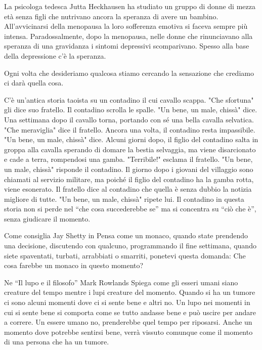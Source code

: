 \documentclass[12pt]{book} %
\begin{document}
La psicologa tedesca Jutta Heckhausen ha studiato un gruppo di donne di mezza età senza figli che nutrivano ancora la
speranza di avere un bambino. All'avvicinarsi della menopausa la loro sofferenza emotiva si faceva
sempre più intensa. Paradossalmente, dopo la menopausa, nelle donne che rinunciavano alla speranza di una gravidanza i
sintomi depressivi scomparivano. Spesso alla base della depressione c'è la speranza. 

\begin{mdframed}[linewidth=1pt]
Ogni volta che desideriamo qualcosa stiamo cercando la sensazione che crediamo ci darà quella cosa. 

C'è un'antica storia taoista su un contadino il cui cavallo scappa.
"Che sfortuna" gli dice suo fratello. Il contadino scrolla le spalle.
"Un bene, un male, chissà" dice. Una settimana dopo il cavallo torna,
portando con sé una bella cavalla selvatica. "Che meraviglia" dice il
fratello. Ancora una volta, il contadino resta impassibile. "Un bene, un male,
chissà" dice. Alcuni giorni dopo, il figlio del contadino salta in groppa alla cavalla sperando di
domare la bestia selvaggia, ma viene disarcionato e cade a terra, rompendosi una gamba.
"Terribile!" esclama il fratello. "Un bene, un male,
chissà" risponde il contadino. Il giorno dopo i giovani del villaggio sono chiamati al servizio
militare, ma poiché il figlio del contadino ha la gamba rotta, viene esonerato. Il fratello dice al contadino che
quella è senza dubbio la notizia migliore di tutte. "Un bene, un male,
chissà" ripete lui. Il contadino in questa storia non si perde nel “che cosa succederebbe se” ma
si concentra su “ciò che è”, senza giudicare il momento.

Come consiglia Jay Shetty in Pensa come un monaco, quando state prendendo una
decisione, discutendo con qualcuno, programmando il fine settimana, quando siete spaventati, turbati, arrabbiati o
smarriti, ponetevi questa domanda: Che cosa farebbe un monaco in questo momento? 

Ne “Il lupo e il filosofo” Mark
Rowlands Spiega come gli esseri umani siano creature del tempo mentre i lupi creature del momento. Quando si ha un
tumore ci sono alcuni momenti dove ci si sente bene e altri no. Un lupo nei momenti in cui si sente bene si comporta
come se tutto andasse bene e può uscire per andare a correre. Un essere umano no, prenderebbe quel tempo per riposarsi.
Anche un momento dove potrebbe sentirsi bene, verrà vissuto comunque come il momento di una persona che ha un tumore.
\end{mdframed}
\end{document}
